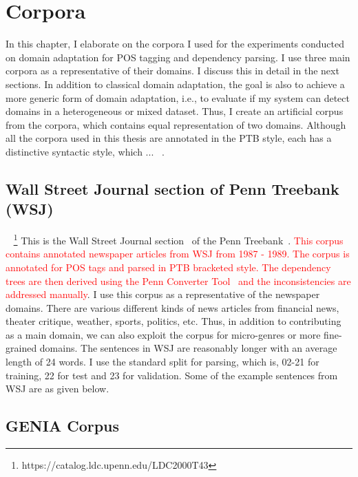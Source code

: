 \chapter{Corpora}

In this chapter, I elaborate on the corpora I used for the experiments conducted on domain adaptation for POS tagging and dependency parsing. I use three main corpora as a representative of their domains. I discuss this in detail in the next sections. In addition to classical domain adaptation, the goal is also to achieve a more generic form of domain adaptation, i.e., to evaluate if my system can detect domains in a heterogeneous or mixed dataset. Thus, I create an artificial corpus from the corpora, which contains equal representation of two domains. Although all the corpora used in this thesis are annotated in the PTB style, each has a distinctive syntactic style, which ... ~.

  
\section{Wall Street Journal section of Penn Treebank (WSJ)}

~
\footnote{https://catalog.ldc.upenn.edu/LDC2000T43}
This is the Wall Street Journal section~\citep{Marcus:1994:PTA:1075812.1075835} of the Penn Treebank~\citep{santorini:90}. \textcolor{red}{This corpus contains annotated newspaper articles from WSJ from 1987 - 1989. The corpus is annotated for POS tags and parsed in PTB bracketed style. The dependency trees are then derived using the Penn Converter Tool~\citep{johansson2007a} and the inconsistencies are addressed manually}. I use this corpus as a representative of the newspaper domains. There are various different kinds of news articles from financial news, theater critique, weather, sports, politics, etc. Thus, in addition to contributing as a main domain, we can also exploit the corpus for micro-genres or more fine-grained domains. The sentences in WSJ are reasonably longer with an average length of 24 words. I use the standard split for parsing, which is, 02-21 for training, 22 for test and 23 for validation. Some of the example sentences from WSJ are as given below.  ~

\section{GENIA Corpus}

